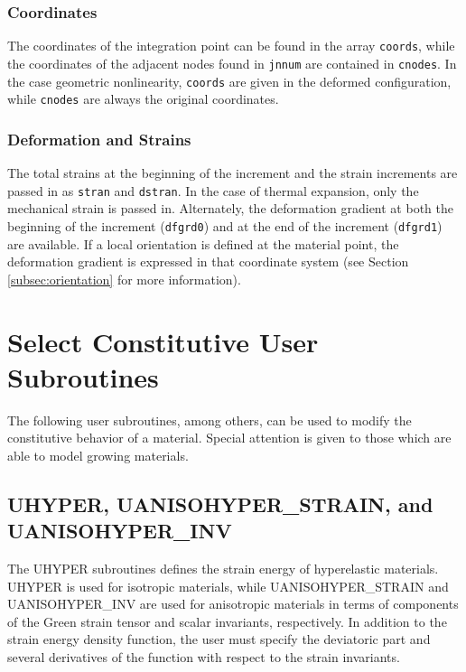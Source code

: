 \documentclass[10pt,letterpaper,oneside]{report}
\begin{document}
\subsubsection{Coordinates}
The coordinates of the integration point can be found in the array \texttt{coords}, while the coordinates of the adjacent nodes found in \texttt{jnnum} are contained in \texttt{cnodes}.  In the case geometric nonlinearity, \texttt{coords} are given in the deformed configuration, while \texttt{cnodes} are always the original coordinates.  

\subsubsection{Deformation and Strains}  
The total strains at the beginning of the increment and the strain increments are passed in as \texttt{stran} and \texttt{dstran}.  In the case of thermal expansion, only the mechanical strain is passed in.  Alternately, the deformation gradient at both the beginning of the increment (\texttt{dfgrd0}) and at the end of the increment (\texttt{dfgrd1}) are available.  If a local orientation is defined at the material point, the deformation gradient is expressed in that coordinate system (see Section \ref{subsec:orientation} for more information).  

\section{Select Constitutive User Subroutines}
The following user subroutines, among others, can be used to modify the constitutive behavior of a material.  Special attention is given to those which are able to model growing materials.

\subsection{UHYPER, UANISOHYPER\_STRAIN, and UANISOHYPER\_INV}
The UHYPER subroutines defines the strain energy of hyperelastic materials.  UHYPER is used for isotropic materials, while UANISOHYPER\_STRAIN and UANISOHYPER\_INV are used for anisotropic materials in terms of components of the Green strain tensor and scalar invariants, respectively.  In addition to the strain energy density function, the user must specify the deviatoric part and several derivatives of the function with respect to the strain invariants. 
\end{document}
